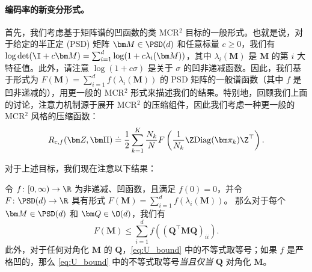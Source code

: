 \documentclass[../../book-main_zh.tex]{subfiles}
\begin{document}
\paragraph{编码率的新变分形式。} 首先，我们考虑基于矩阵谱的凹函数的类 MCR$^2$ 目标的一般形式。也就是说，对于给定的半正定 (PSD) 矩阵 $\bm M \in \PSD(d)$ 和任意标量 $c \geq 0$，我们有 $\log \det (\I + c \bm M) = \sum_{i=1}^{d} \log( 1 + c \lambda_i(\bm
M))$，其中 $\lambda_i (\bm M)$ 是 $\bm M$ 的第 $i$ 大特征值。此外，请注意 $\log(1 + c \sigma)$ 是关于 $\sigma$ 的凹非递减函数。因此，我们基于形式为 $F(\bm M) = \sum_{i=1}^{d}
f(\lambda_i(\bm M))$ 的 PSD 矩阵的一般谱函数（其中 $f$ 是凹非递减的），用更一般的 MCR$^2$ 形式来描述我们的结果。特别地，回顾我们上面的讨论，注意力机制源于展开 MCR$^2$ 的压缩组件，因此我们考虑一种更一般的 MCR$^2$ 风格的压缩函数：
\vspace{-2mm}
\begin{equation}
    R_{c,f}(\bm Z, \bm \Pi) \doteq \frac{1}{2}\sum_{k=1}^K
    \frac{N_k}{N} F\left( \frac{1}{N_k}\Z \mathrm{Diag}(\bm \pi_k)
    \Z^{\top} \right).
    \label{eq:mcr_c_gen}
\end{equation}

对于上述目标，我们现在注意以下结果：
\begin{theorem}
    \label{thm:var_concave}
    令 \(f \colon [0, \infty) \to \R\) 为非递减、凹函数，且满足 \(f(0) = 0\)，并令 \(F \colon \PSD(d) \to \R\) 具有形式 \(F(\bm M) = \sum_{i = 1}^{d}f(\lambda_{i}(\bm M))\)。
    那么对于每个 \(\bm M \in \PSD(d)\) 和 \(\bm Q \in \O(d)\)，我们有
    \begin{equation}
        \label{eq:U_bound}
        F(\bm M) \leq  \sum_{i=1}^{d} f\left( (\bm Q^{\top} \bm M \bm
        Q)_{ii} \right).
    \end{equation}
    此外，对于任何对角化 $\bm M$ 的 $\bm Q$，\eqref{eq:U_bound} 中的不等式取等号；如果 $f$ 是严格凹的，那么 \eqref{eq:U_bound} 中的不等式取等号\textit{当且仅当} $\bm Q$ 对角化 $\bm M$。
\end{theorem}
\end{document}
